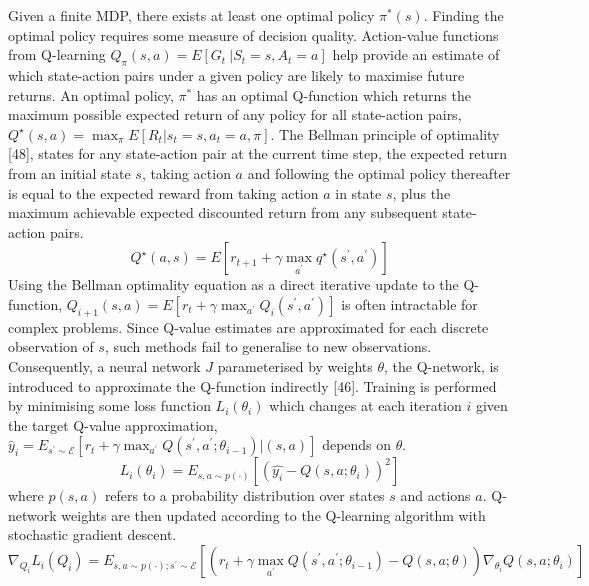 \documentclass[runningheads]{llncs}
\begin{document}
Given a finite MDP, there exists at least one optimal
policy $\pi^*(s)$. Finding the optimal policy requires some measure of decision quality. Action-value functions from Q-learning $Q_\pi(s,a) = E \left[G_t \ | S_t = s, A_t = a \right]$ help provide an estimate of which state-action pairs under a given policy are likely to maximise future returns. An optimal policy, $\pi^*$ has an optimal Q-function which returns the maximum possible expected return of any policy for all state-action pairs,
\begin{math}
	Q^\star(s,a) = \max_\pi E \left[R_t | s_t = s, a_t = a, \pi\right]
\end{math}.
The Bellman principle of optimality [48], states for any state-action pair at the current time step, the expected return from an initial state $s$, taking action $a$ and following the optimal policy thereafter is equal to the expected reward from taking action $a$ in state $s$, plus the maximum achievable expected discounted return from any subsequent state-action pairs.
\begin{equation}
	Q^\star(a,s) = E \left[r_{t+1} + \gamma \max_{a^\prime} q^\star(s^\prime, a^\prime)\right]
\end{equation} Using the Bellman optimality equation as a direct iterative update to the Q-function, $Q_{i+1}(s,a) = E \left[r_t + \gamma \max_{a^{\prime}} Q_i (s^\prime, a^\prime)\right]$ is often intractable for complex problems. Since Q-value estimates are approximated for each discrete observation of $s$, such methods fail to generalise to new observations. Consequently, a neural network $J$ parameterised by weights $\theta$, the Q-network, is introduced to approximate the Q-function indirectly [46]. Training is performed by minimising some loss function $L_i(\theta_i)$ which changes at each iteration $i$ given the target Q-value approximation, $\hat y_i = E_{s^{\prime} \sim\mathcal{E}} \left[r_t + \gamma \max_{a^{\prime}} Q(s^\prime, a^{\prime}; \theta_{i-1}) | (s,a)\right]$ depends on $\theta$. 
\begin{equation}
	L_i(\theta_i) = E_{s,a \sim p(\cdot)}\left[(\hat{y_i} - Q(s,a;\theta_i))^2\right]
\end{equation} where $p(s,a)$ refers to a probability distribution over states $s$ and actions $a$. Q-network weights are then updated according to the Q-learning algorithm with stochastic gradient descent.
\begin{equation}
	\nabla_{Q_i} L_i(Q_i) = E_{s,a\sim p(\cdot); s^\prime \sim \mathcal{E}} \left[(r_t + \gamma \max_{a^\prime} Q(s^\prime, a^\prime; \theta_{i-1})- Q(s,a;\theta)) \nabla_{\theta_{i}}Q(s,a;\theta_i)\right]
\end{equation}
\end{document}
